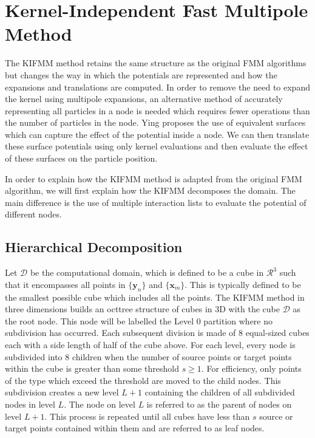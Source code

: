 \FloatBarrier
\section{Kernel-Independent Fast Multipole Method}\label{sec:KIFMM}

The KIFMM method retains the same structure as the original FMM algorithms but changes the way in which the potentials are represented and how the expansions and translations are computed. In order to remove the need to expand the kernel using multipole expansions, an alternative method of accurately representing all particles in a node is needed which requires fewer operations than the number of particles in the node. Ying \cite{Ying2004} proposes the use of equivalent surfaces which can capture the effect of the potential inside a node. We can then translate these surface potentials using only kernel evaluations and then evaluate the effect of these surfaces on the particle position.

In order to explain how the KIFMM method is adapted from the original FMM algorithm, we will first explain how the KIFMM decomposes the domain. The main difference is the use of multiple interaction lists to evaluate the potential of different nodes. 

\subsection{Hierarchical Decomposition}
Let $\mathcal{D}$ be the computational domain, which is defined to be a cube in $\mathcal{R}^3$ such that it encompasses all points in $\{\bm{y}_n\}$ and $\{\bm{x}_m\}$. This is typically defined to be the smallest possible cube which includes all the points. The KIFMM method in three dimensions builds an octtree structure of cubes in 3D with the cube $\mathcal{D}$ as the root node. This node will be labelled the Level $0$ partition where no subdivision has occurred. Each subsequent division is made of $8$ equal-sized cubes each with a side length of half of the cube above. For each level, every node is subdivided into $8$ children when the number of source points or target points within the cube is greater than some threshold $s\geq 1$. For efficiency, only points of the type which exceed the threshold are moved to the child nodes. This subdivision creates a new level $L+1$ containing the children of all subdivided nodes in level $L$. The node on level $L$ is referred to as the parent of nodes on level $L+1$. This process is repeated until all cubes have less than $s$ source or target points contained within them and are referred to as leaf nodes.

